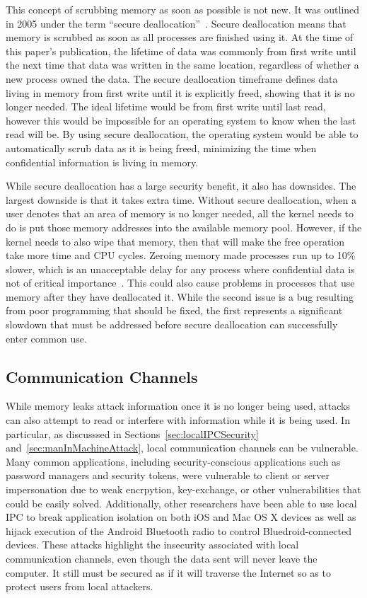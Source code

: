 This concept of scrubbing memory as soon as possible is not new.  It was outlined in 2005 under the term ``secure deallocation''~\cite{chow2005shredding}.  Secure deallocation means that memory is scrubbed as soon as all processes are finished using it.  At the time of this paper's publication, the lifetime of data was commonly from first write until the next time that data was written in the same location, regardless of whether a new process owned the data.  The secure deallocation timeframe defines data living in memory from first write until it is explicitly freed, showing that it is no longer needed.  The ideal lifetime would be from first write until last read, however this would be impossible for an operating system to know when the last read will be.  By using secure deallocation, the operating system would be able to automatically scrub data as it is being freed, minimizing the time when confidential information is living in memory.

While secure deallocation has a large security benefit, it also has downsides.  The largest downside is that it takes extra time.  Without secure deallocation, when a user denotes that an area of memory is no longer needed, all the kernel needs to do is put those memory addresses into the available memory pool.  However, if the kernel needs to also wipe that memory, then that will make the free operation take more time and CPU cycles.  Zeroing memory made processes run up to 10\% slower, which is an unacceptable delay for any process where confidential data is not of critical importance~\cite{chow2005shredding}.  This could also cause problems in processes that use memory after they have deallocated it.  While the second issue is a bug resulting from poor programming that should be fixed, the first represents a significant slowdown that must be addressed before secure deallocation can successfully enter common use.

\subsection{Communication Channels}
\label{sec:communicationChannels}
While memory leaks attack information once it is no longer being used, attacks can also attempt to read or interfere with information while it is being used.  In particular, as discusssed in Sections~\ref{sec:localIPCSecurity} and~\ref{sec:manInMachineAttack}, local communication channels can be vulnerable.  Many common applications, including security-conscious applications such as password managers and security tokens, were vulnerable to client or server impersonation due to weak encrpytion, key-exchange, or other vulnerabilities that could be easily solved.  Additionally, other researchers have been able to use local IPC to break application isolation on both iOS and Mac OS X devices as well as hijack execution of the Android Bluetooth radio to control Bluedroid-connected devices.  These attacks highlight the insecurity associated with local communication channels, even though the data sent will never leave the computer.  It still must be secured as if it will traverse the Internet so as to protect users from local attackers.

